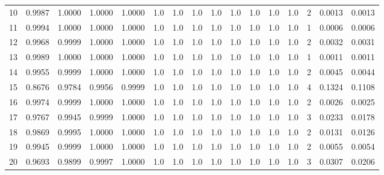 \begin{tabular}{lrrrrrrrrrrrrrrr}
10  &      0.9987 &  1.0000 &  1.0000 &  1.0000 &     1.0 &     1.0 &     1.0 &     1.0 &     1.0 &     1.0 &      1.0 &        1.0 &      2 &                    0.0013 &                     0.0013 \\
11  &      0.9994 &  1.0000 &  1.0000 &  1.0000 &     1.0 &     1.0 &     1.0 &     1.0 &     1.0 &     1.0 &      1.0 &        1.0 &      1 &                    0.0006 &                     0.0006 \\
12  &      0.9968 &  0.9999 &  1.0000 &  1.0000 &     1.0 &     1.0 &     1.0 &     1.0 &     1.0 &     1.0 &      1.0 &        1.0 &      2 &                    0.0032 &                     0.0031 \\
13  &      0.9989 &  1.0000 &  1.0000 &  1.0000 &     1.0 &     1.0 &     1.0 &     1.0 &     1.0 &     1.0 &      1.0 &        1.0 &      1 &                    0.0011 &                     0.0011 \\
14  &      0.9955 &  0.9999 &  1.0000 &  1.0000 &     1.0 &     1.0 &     1.0 &     1.0 &     1.0 &     1.0 &      1.0 &        1.0 &      2 &                    0.0045 &                     0.0044 \\
15  &      0.8676 &  0.9784 &  0.9956 &  0.9999 &     1.0 &     1.0 &     1.0 &     1.0 &     1.0 &     1.0 &      1.0 &        1.0 &      4 &                    0.1324 &                     0.1108 \\
16  &      0.9974 &  0.9999 &  1.0000 &  1.0000 &     1.0 &     1.0 &     1.0 &     1.0 &     1.0 &     1.0 &      1.0 &        1.0 &      2 &                    0.0026 &                     0.0025 \\
17  &      0.9767 &  0.9945 &  0.9999 &  1.0000 &     1.0 &     1.0 &     1.0 &     1.0 &     1.0 &     1.0 &      1.0 &        1.0 &      3 &                    0.0233 &                     0.0178 \\
18  &      0.9869 &  0.9995 &  1.0000 &  1.0000 &     1.0 &     1.0 &     1.0 &     1.0 &     1.0 &     1.0 &      1.0 &        1.0 &      2 &                    0.0131 &                     0.0126 \\
19  &      0.9945 &  0.9999 &  1.0000 &  1.0000 &     1.0 &     1.0 &     1.0 &     1.0 &     1.0 &     1.0 &      1.0 &        1.0 &      2 &                    0.0055 &                     0.0054 \\
20  &      0.9693 &  0.9899 &  0.9997 &  1.0000 &     1.0 &     1.0 &     1.0 &     1.0 &     1.0 &     1.0 &      1.0 &        1.0 &      3 &                    0.0307 &                     0.0206 \\

\end{tabular}
